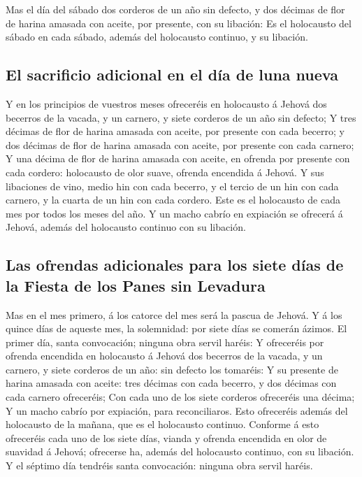  Mas el día del sábado dos corderos de un año sin defecto,
y dos décimas de flor de harina amasada con aceite, por presente, con su
libación:  Es el holocausto del sábado en cada sábado,
además del holocausto continuo, y su libación.

\hypertarget{el-sacrificio-adicional-en-el-duxeda-de-luna-nueva}{%
\subsection{El sacrificio adicional en el día de luna
nueva}\label{el-sacrificio-adicional-en-el-duxeda-de-luna-nueva}}

 Y en los principios de vuestros meses ofreceréis en
holocausto á Jehová dos becerros de la vacada, y un carnero, y siete
corderos de un año sin defecto;  Y tres décimas de flor
de harina amasada con aceite, por presente con cada becerro; y dos
décimas de flor de harina amasada con aceite, por presente con cada
carnero;  Y una décima de flor de harina amasada con
aceite, en ofrenda por presente con cada cordero: holocausto de olor
suave, ofrenda encendida á Jehová.  Y sus libaciones de
vino, medio hin con cada becerro, y el tercio de un hin con cada
carnero, y la cuarta de un hin con cada cordero. Este es el holocausto
de cada mes por todos los meses del año.  Y un macho
cabrío en expiación se ofrecerá á Jehová, además del holocausto continuo
con su libación.

\hypertarget{las-ofrendas-adicionales-para-los-siete-duxedas-de-la-fiesta-de-los-panes-sin-levadura}{%
\subsection{Las ofrendas adicionales para los siete días de la Fiesta de
los Panes sin
Levadura}\label{las-ofrendas-adicionales-para-los-siete-duxedas-de-la-fiesta-de-los-panes-sin-levadura}}

 Mas en el mes primero, á los catorce del mes será la
pascua de Jehová.  Y á los quince días de aqueste mes, la
solemnidad: por siete días se comerán ázimos.  El primer
día, santa convocación; ninguna obra servil haréis:  Y
ofreceréis por ofrenda encendida en holocausto á Jehová dos becerros de
la vacada, y un carnero, y siete corderos de un año: sin defecto los
tomaréis:  Y su presente de harina amasada con aceite:
tres décimas con cada becerro, y dos décimas con cada carnero
ofreceréis;  Con cada uno de los siete corderos
ofreceréis una décima;  Y un macho cabrío por expiación,
para reconciliaros.  Esto ofreceréis además del
holocausto de la mañana, que es el holocausto continuo. 
Conforme á esto ofreceréis cada uno de los siete días, vianda y ofrenda
encendida en olor de suavidad á Jehová; ofrecerse ha, además del
holocausto continuo, con su libación.  Y el séptimo día
tendréis santa convocación: ninguna obra servil haréis.

